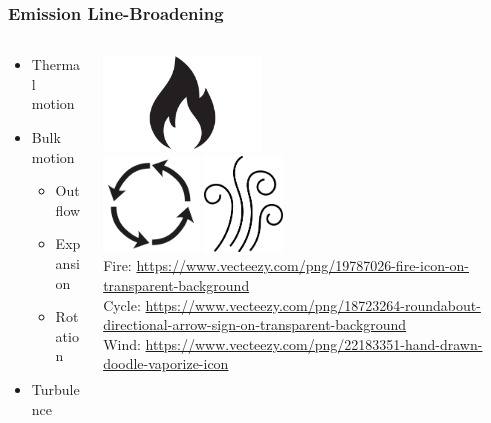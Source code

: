 \documentclass[aspectratio=169,compress]{beamer}
\newcommand\teeny{\fontsize{3pt}{3.6pt}\selectfont}
\begin{document}
\begin{frame}
  \frametitle{Emission Line-Broadening}
  \begin{columns}
    \begin{column}{0.3\linewidth}
      \begin{itemize}
        \item Thermal motion
        \item Bulk motion
          \begin{itemize}
            \item Outflow
            \item Expansion
            \item Rotation
          \end{itemize}
        \item Turbulence
      \end{itemize}
    \end{column}
    \begin{column}{0.7\linewidth}
      \centering
      \includegraphics[height=1in]{figures/fire.png}\\
      \includegraphics[height=1in]{figures/cycle.png}
      \includegraphics[height=1in]{figures/wind.png}
      {\teeny\\ Fire: \url{https://www.vecteezy.com/png/19787026-fire-icon-on-transparent-background}}
      {\teeny\\ Cycle: \url{https://www.vecteezy.com/png/18723264-roundabout-directional-arrow-sign-on-transparent-background}}
      {\teeny\\ Wind: \url{https://www.vecteezy.com/png/22183351-hand-drawn-doodle-vaporize-icon}}
    \end{column}
  \end{columns}
\end{frame}
\end{document}
